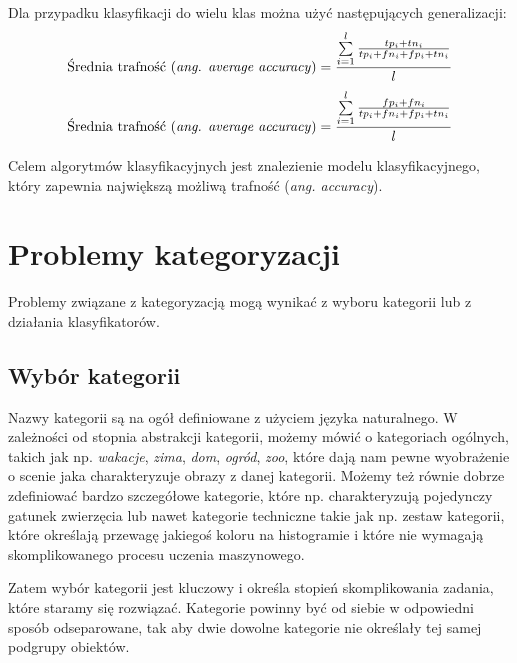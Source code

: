 Dla przypadku klasyfikacji do wielu klas można użyć następujących generalizacji\cite{SOKOLOVA09}:
\begin{equation}
\label{cm_accuracy_multi} 
\text{Średnia trafność (\emph{ang. average accuracy})} = \frac{\sum\limits_{i=1}^l \frac{tp_i + tn_i}{tp_i + fn_i + fp_i + tn_i}}{l}
\end{equation}
\begin{equation}
\label{cm_error_multi} 
\text{Średnia trafność (\emph{ang. average accuracy})} = \frac{\sum\limits_{i=1}^l \frac{fp_i + fn_i}{tp_i + fn_i + fp_i + tn_i}}{l}
\end{equation}

Celem algorytmów klasyfikacyjnych jest znalezienie modelu klasyfikacyjnego, który zapewnia największą możliwą trafność (\emph{ang. accuracy}).

\section{Problemy kategoryzacji}


Problemy związane z kategoryzacją mogą wynikać z wyboru kategorii lub z działania klasyfikatorów.  

\subsection{Wybór kategorii}

Nazwy kategorii są na ogół definiowane z użyciem języka naturalnego. W zależności od stopnia abstrakcji kategorii, możemy mówić o kategoriach ogólnych, takich jak np. \emph{wakacje}, \emph{zima}, \emph{dom}, \emph{ogród}, \emph{zoo}, które dają nam pewne wyobrażenie o scenie jaka charakteryzuje obrazy z danej kategorii. Możemy też równie dobrze zdefiniować bardzo szczegółowe kategorie, które np. charakteryzują pojedynczy gatunek zwierzęcia lub nawet kategorie techniczne takie jak np. zestaw kategorii, które określają przewagę jakiegoś koloru na histogramie i które nie wymagają skomplikowanego procesu uczenia maszynowego. 

Zatem wybór kategorii jest kluczowy i określa stopień skomplikowania zadania, które staramy się rozwiązać. Kategorie powinny być od siebie w odpowiedni sposób odseparowane, tak aby dwie dowolne kategorie nie określały tej samej podgrupy obiektów.

